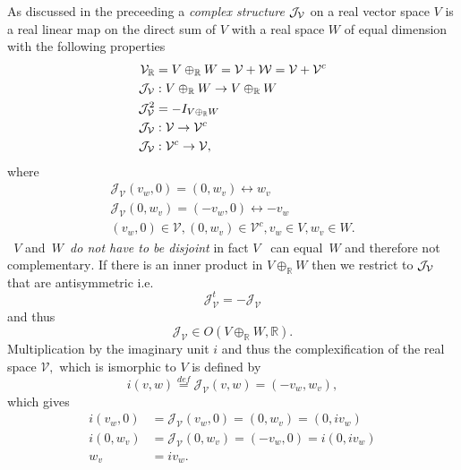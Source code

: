 \documentclass[aps,preprint]{revtex4}
\begin{document}
As discussed in the preceeding a \emph{complex structure} $\mathcal{J}_{%
\mathcal{V}}$ on a real vector space $V$ is a real linear map on the direct
sum of $V$ with a real space $W$ of equal dimension with the following
properties 
\begin{align}
\mathcal{V}_{\mathbb{R}} & =V\oplus_{\mathbb{R}}W=\mathcal{V}+\mathcal{W}=%
\mathcal{V}+\mathcal{V}^{c} \\
\mathcal{J}_{\mathcal{V}} & :V\oplus_{\mathbb{R}}W\rightarrow V\oplus _{%
\mathbb{R}}W \\
\mathcal{J}_{\mathcal{V}}^{2} & =-I_{V\oplus_{\mathbb{R}}W} \\
\mathcal{J}_{\mathcal{V}} & :\mathcal{V}\rightarrow\mathcal{V}^{c} \\
\mathcal{J}_{\mathcal{V}} & :\mathcal{V}^{c}\rightarrow\mathcal{V},
\end{align}
where 
\begin{gather}
\mathcal{J}_{\mathcal{V}}\left( v_{w},0\right) =\left( 0,w_{v}\right)
\leftrightarrow w_{v} \\
\mathcal{J}_{\mathcal{V}}\left( 0,w_{v}\right) =\left( -v_{w},0\right)
\leftrightarrow-v_{w} \\
\left( v_{w},0\right) \in\mathcal{V},\left( 0,w_{v}\right) \in \mathcal{V}%
^{c},v_{w}\in V,w_{v}\in W.
\end{gather}
\emph{\ }$V$ and\emph{\ }$W$\emph{\ do not have to be disjoint} in fact $V$%
\emph{\ }can equal\emph{\ }$W$ and therefore not complementary$.$ If there
is an inner product in $V\oplus_{\mathbb{R}}W$ then we restrict to $\mathcal{%
J}_{\mathcal{V}}$ that are antisymmetric i.e. 
\begin{equation}
\mathcal{J}_{\mathcal{V}}^{t}=-\mathcal{J}_{\mathcal{V}}
\end{equation}
and thus 
\begin{equation}
\mathcal{J}_{\mathcal{V}}\in O\left( V\oplus_{\mathbb{R}}W,\mathbb{R}\right)
.
\end{equation}
Multiplication by the imaginary unit $i$ and thus the complexification of
the real space $\mathcal{V},$ which is ismorphic to $V$ is defined by 
\begin{equation}
i\left( v,w\right) \overset{def}{=}\mathcal{J}_{\mathcal{V}}\left(
v,w\right) =\left( -v_{w},w_{v}\right) ,
\end{equation}
which gives 
\begin{align}
i\left( v_{w},0\right) & =\mathcal{J}_{\mathcal{V}}\left( v_{w},0\right)
=\left( 0,w_{v}\right) =\left( 0,iv_{w}\right) \\
i\left( 0,w_{v}\right) & =\mathcal{J}_{\mathcal{V}}\left( 0,w_{v}\right)
=\left( -v_{w},0\right) =i\left( 0,iv_{w}\right) \\
w_{v} & =iv_{w}.
\end{align}
\end{document}
